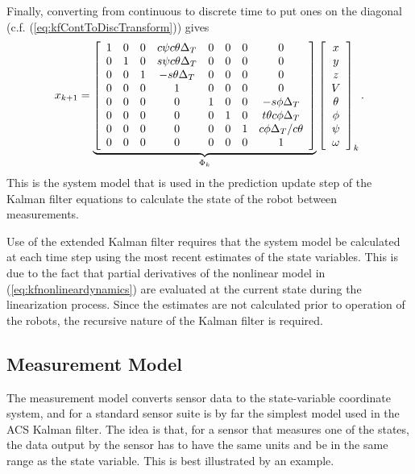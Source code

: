 Finally, converting from continuous to discrete time to put ones on the diagonal (c.f. (\ref{eq:kfContToDiscTransform})) gives
\begin{align}
\label{eq:kfSystemModelWithAssumptions}
x_{k+1} = 
\underbrace{\left[\begin{array}{c c c c c c c c}
1 & 0 & 0 & c\psi c\theta \Delta_T & 0 & 0 & 0 & 0 \\
0 & 1 & 0 & s\psi c\theta \Delta_T & 0 & 0 & 0 & 0\\
0 & 0 & 1 & -s\theta \Delta_T & 0 & 0 & 0 & 0\\
0 & 0 & 0 & 1 & 0 & 0 & 0 & 0 \\
0 & 0 & 0 & 0 & 1 & 0 & 0 & -s\phi \Delta_T \\
0 & 0 & 0 & 0 & 0 & 1 & 0 & t\theta c\phi \Delta_T \\
0 & 0 & 0 & 0 & 0 & 0 & 1 & c\phi \Delta_T/c\theta \\
0 & 0 & 0 & 0 & 0 & 0 & 0 & 1
\end{array}\right]}_{\Phi_k}
\left[\begin{array}{c}
x \\ y \\ z \\ V \\ \theta \\ \phi \\ \psi \\ \omega
\end{array}\right]_k.
\end{align}
This is the system model that is used in the prediction update step of the Kalman filter equations to calculate the state of the robot between measurements.

Use of the extended Kalman filter requires that the system model be calculated at each time step using the most recent estimates of the state variables.
This is due to the fact that partial derivatives of the nonlinear model in (\ref{eq:kfnonlineardynamics}) are evaluated at the current state during the linearization process.
Since the estimates are not calculated prior to operation of the robots, the recursive nature of the Kalman filter is required.

\subsection{Measurement Model}%
\label{sec:kfMeasurementModel}
The measurement model converts sensor data to the state-variable coordinate system, and for a standard sensor suite is by far the simplest model used in the ACS Kalman filter.
The idea is that, for a sensor that measures one of the states, the data output by the sensor has to have the same units and be in the same range as the state variable.
This is best illustrated by an example.

